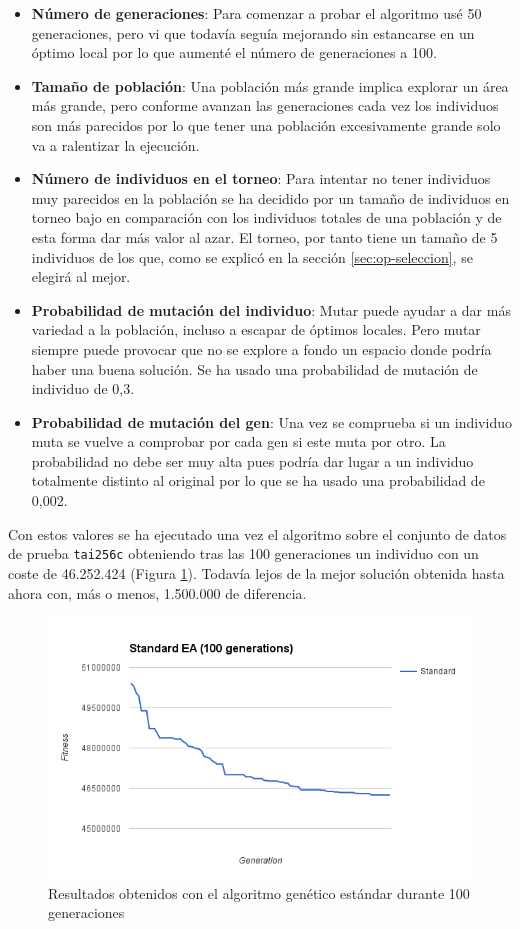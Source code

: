 \begin{itemize}
	\item \textbf{Número de generaciones}: Para comenzar a probar el algoritmo usé 50 generaciones, pero vi que todavía seguía mejorando sin estancarse en un óptimo local por lo que aumenté el número de generaciones a 100.
	\item \textbf{Tamaño de población}: Una población más grande implica explorar un área más grande, pero conforme avanzan las generaciones cada vez los individuos son más parecidos por lo que tener una población excesivamente grande solo va a ralentizar la ejecución.
	\item \textbf{Número de individuos en el torneo}: Para intentar no tener individuos muy parecidos en la población se ha decidido por un tamaño de individuos en torneo bajo en comparación con los individuos totales de una población y de esta forma dar más valor al azar. El torneo, por tanto tiene un tamaño de 5 individuos de los que, como se explicó en la sección \ref{sec:op-seleccion}, se elegirá al mejor.
	\item \textbf{Probabilidad de mutación del individuo}: Mutar puede ayudar a dar más variedad a la población, incluso a escapar de óptimos locales. Pero mutar siempre puede provocar que no se explore a fondo un espacio donde podría haber una buena solución. Se ha usado una probabilidad de mutación de individuo de 0,3.
	\item \textbf{Probabilidad de mutación del gen}: Una vez se comprueba si un individuo muta se vuelve a comprobar por cada gen si este muta por otro. La probabilidad no debe ser muy alta pues podría dar lugar a un individuo totalmente distinto al original por lo que se ha usado una probabilidad de 0,002.
\end{itemize}

Con estos valores se ha ejecutado una vez el algoritmo sobre el conjunto de datos de prueba \texttt{tai256c} obteniendo tras las 100 generaciones un individuo con un coste de 46.252.424 (Figura \ref{fig:standard-ea}). Todavía lejos de la mejor solución obtenida hasta ahora con, más o menos, 1.500.000 de diferencia.

\begin{figure}[H]
	\centering
	\includegraphics[width=14cm]{img/standard-ea}
	\caption{Resultados obtenidos con el algoritmo genético estándar durante 100 generaciones}
	\label{fig:standard-ea}
\end{figure}

